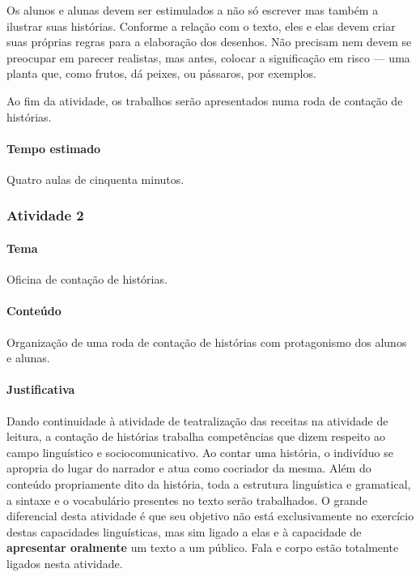 \documentclass[11pt]{extarticle}
\begin{document}
Os alunos e alunas devem ser estimulados a não só escrever mas também a 
ilustrar suas histórias. Conforme a relação com o texto, eles e elas
devem criar suas próprias regras para a elaboração dos desenhos. 
Não precisam nem devem se preocupar em parecer realistas, 
mas antes, colocar a significação em risco --- uma planta que,
como frutos, dá  peixes, ou pássaros, por exemplos. 

Ao fim da atividade, os trabalhos serão apresentados numa roda de contação de histórias. 

\paragraph{Tempo estimado} Quatro aulas de cinquenta minutos.


\subsubsection{Atividade 2}


\paragraph{Tema} Oficina de contação de histórias. 

\paragraph{Conteúdo} Organização de uma roda de contação de histórias
com protagonismo dos alunos e alunas.

\paragraph{Justificativa} Dando continuidade à atividade de teatralização das
receitas na atividade de leitura, a contação de histórias trabalha competências
que dizem respeito ao campo linguístico e sociocomunicativo. 
Ao contar uma história, o indivíduo se apropria do lugar do narrador e
atua como cocriador da mesma. Além do conteúdo propriamente dito 
da história, toda a estrutura linguística e gramatical, a sintaxe 
e o vocabulário presentes no texto serão trabalhados. 
O grande diferencial desta atividade é que seu objetivo não está 
exclusivamente no exercício destas capacidades linguísticas, 
mas sim ligado a elas e à capacidade de \textbf{apresentar oralmente}
um texto a um público. Fala e corpo estão totalmente ligados nesta atividade. 
\end{document}
